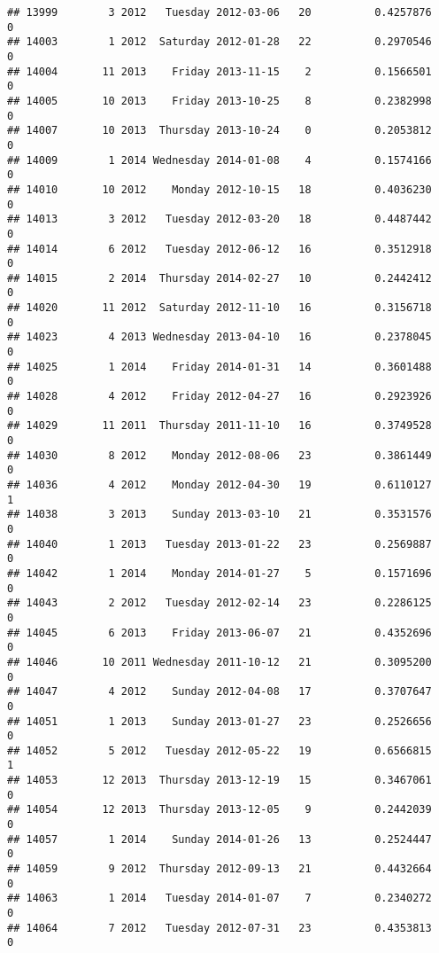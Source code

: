 \documentclass[
]{article}
\begin{document}
\begin{verbatim}
## 13999        3 2012   Tuesday 2012-03-06   20          0.4257876             0
## 14003        1 2012  Saturday 2012-01-28   22          0.2970546             0
## 14004       11 2013    Friday 2013-11-15    2          0.1566501             0
## 14005       10 2013    Friday 2013-10-25    8          0.2382998             0
## 14007       10 2013  Thursday 2013-10-24    0          0.2053812             0
## 14009        1 2014 Wednesday 2014-01-08    4          0.1574166             0
## 14010       10 2012    Monday 2012-10-15   18          0.4036230             0
## 14013        3 2012   Tuesday 2012-03-20   18          0.4487442             0
## 14014        6 2012   Tuesday 2012-06-12   16          0.3512918             0
## 14015        2 2014  Thursday 2014-02-27   10          0.2442412             0
## 14020       11 2012  Saturday 2012-11-10   16          0.3156718             0
## 14023        4 2013 Wednesday 2013-04-10   16          0.2378045             0
## 14025        1 2014    Friday 2014-01-31   14          0.3601488             0
## 14028        4 2012    Friday 2012-04-27   16          0.2923926             0
## 14029       11 2011  Thursday 2011-11-10   16          0.3749528             0
## 14030        8 2012    Monday 2012-08-06   23          0.3861449             0
## 14036        4 2012    Monday 2012-04-30   19          0.6110127             1
## 14038        3 2013    Sunday 2013-03-10   21          0.3531576             0
## 14040        1 2013   Tuesday 2013-01-22   23          0.2569887             0
## 14042        1 2014    Monday 2014-01-27    5          0.1571696             0
## 14043        2 2012   Tuesday 2012-02-14   23          0.2286125             0
## 14045        6 2013    Friday 2013-06-07   21          0.4352696             0
## 14046       10 2011 Wednesday 2011-10-12   21          0.3095200             0
## 14047        4 2012    Sunday 2012-04-08   17          0.3707647             0
## 14051        1 2013    Sunday 2013-01-27   23          0.2526656             0
## 14052        5 2012   Tuesday 2012-05-22   19          0.6566815             1
## 14053       12 2013  Thursday 2013-12-19   15          0.3467061             0
## 14054       12 2013  Thursday 2013-12-05    9          0.2442039             0
## 14057        1 2014    Sunday 2014-01-26   13          0.2524447             0
## 14059        9 2012  Thursday 2012-09-13   21          0.4432664             0
## 14063        1 2014   Tuesday 2014-01-07    7          0.2340272             0
## 14064        7 2012   Tuesday 2012-07-31   23          0.4353813             0

\end{verbatim}
\end{document}
